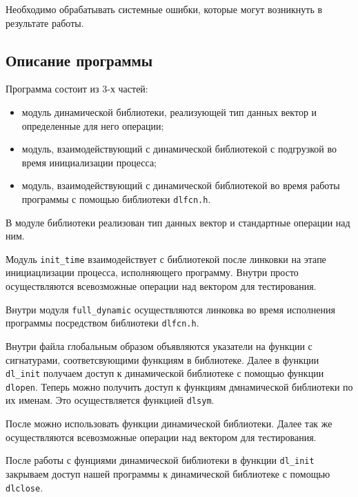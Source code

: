 \documentclass[12pt]{article}
\begin{document}
Необходимо обрабатывать системные ошибки, которые могут возникнуть в результате работы.

\subsection*{Описание программы}

Программа состоит из 3-х частей: 
\begin{itemize}
    \item модуль динамической библиотеки, реализующей тип данных вектор и определенные для него операции;
    \item модуль, взаимодействующий с динамической библиотекой с подгрузкой во время инициализации процесса;
    \item модуль, взаимодействующий с динамической библиотекой во время работы программы с помощью библиотеки \verb|dlfcn.h|.
\end{itemize}

В модуле библиотеки реализован тип данных вектор и стандартные операции над ним.

Модуль \verb|init_time| взаимодействует с библиотекой после линковки на этапе инициацлизации процесса, исполняющего программу. Внутри просто осуществляются всевозможные операции над вектором для тестирования.

Внутри модуля \verb|full_dynamic| осуществляются линковка во время исполнения программы посредством библиотеки \verb|dlfcn.h|.

Внутри файла глобальным образом объявляются указатели на функции с сигнатурами, соответсвующими функциям в библиотеке. Далее в функции \verb|dl_init| получаем доступ к динамической библиотеке с помощью функции \verb|dlopen|. Теперь можно получить доступ к функциям дмнамической библиотеки по их именам. Это осуществляется функцией \verb|dlsym|.

После можно использовать функции динамической библиотеки.
Далее так же осуществляются всевозможные операции над вектором для тестирования.

После работы с фунциями динамической библиотеки в функции \verb|dl_init| закрываем доступ нашей программы к динамической библиотеке с помощью \verb|dlclose|.
\end{document}
